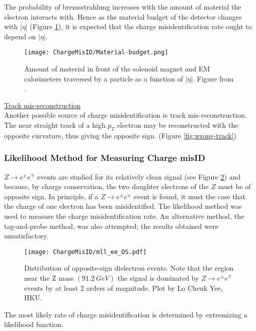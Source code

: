 The probability of bremsstrahlung increases with the amount of material the electron interacts with. Hence as the material budget of the detector changes with $|\eta|$ (Figure \ref{fig:material-budget}), it is expected that the charge misidentification rate ought to depend on  $|\eta|$.

\begin{figure}[h]
\centering
\texttt{[image: ChargeMisID/Material-budget.png]}
\caption[Amount of material traversed by a particle as a function of $|\eta|$]{Amount of material in front of the solenoid magnet and EM calorimeters traversed by a particle as a function of $|\eta|$. Figure from \cite{ElectronReco2011}.}
\label{fig:material-budget}
\end{figure}

\underline{Track mis-reconstruction}\\
Another possible source of charge misidentification is track mis-reconstruction. The near straight track of a high $p_T$ electron may be reconstructed with the opposite curvature, thus giving the opposite sign. (Figure \ref{fig:wrong-track})

\subsubsection*{Likelihood Method for Measuring Charge misID}
$Z\rightarrow e^\pm e^\mp$ events are studied for its relatively clean signal (see Figure \ref{fig:mll_ee_OS}) and because, by charge conservation,  the two daughter electrons of the $Z$ must be of opposite sign. In principle, if a $Z\rightarrow e^\pm e^\pm$ event is found, it must the case that the charge of one electron has been misidentified. The likelihood method was used to measure the charge misidentification rate. An alternative method, the tag-and-probe method, was also attempted; the results obtained were unsatisfactory. 

\begin{figure}[h]
\centering
\texttt{[image: ChargeMisID/mll\_ee\_OS.pdf]}
\caption[Distribution of opposite-sign dielectron events]{Distribution of opposite-sign dielectron events. Note that the region near the Z mass $(91.2\ GeV)$ the signal is dominated by $Z\rightarrow e^\pm e^\mp$ events by at least 2 orders of magnitude. Plot by Lo Cheuk Yee, HKU.}
\label{fig:mll_ee_OS}
\end{figure}

The most likely rate of charge misidentification is determined by extremizing a likelihood function. 

